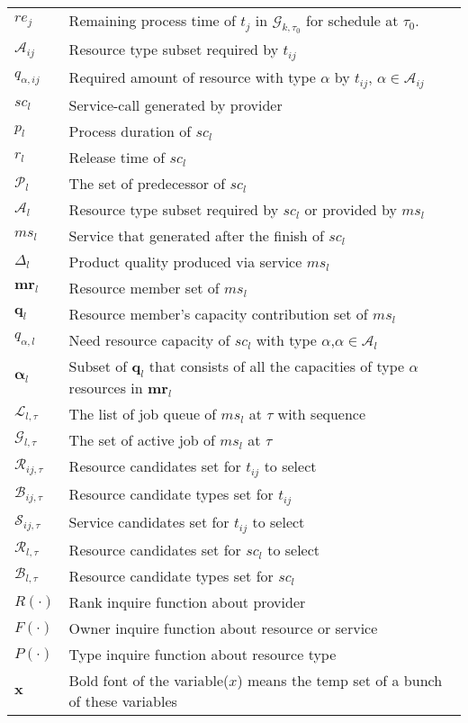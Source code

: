 \begin{table}[htbp]
\begin{tabularx}{\textwidth}{|lX|}
    $re_j$ & Remaining process time of $t_j$ in $\mathcal{G}_{k,\tau_0}$ for schedule at $\tau_0$. \\
    $\mathcal{A}_{ij}$ & Resource type subset required by $t_{ij}$\\ %
    $q_{\alpha,ij}$ & Required amount of resource with type $\alpha$ by $t_{ij}$, $\alpha\in\mathcal{A}_{ij}$\\
    $sc_l$ & Service-call generated by provider\\
    $p_l$ & Process duration of $sc_l$\\
    $r_l$ & Release time of $sc_l$\\
    $\mathcal{P}_{l}$ & The set of predecessor of $sc_{l}$\\
    $\mathcal{A}_l$ & Resource type subset required by $sc_l$ or provided by $ms_l$ \\ %
    $ms_l$ & Service that generated after the finish of $sc_l$\\
    $\Delta_l$ & Product quality produced via service $ms_l$\\
    $\bm{mr}_l$ & Resource member set of $ms_l$\\
    $\bm{q}_l$ & Resource member's capacity contribution set of $ms_l$\\
    $q_{\alpha,l}$ & Need resource capacity of $sc_l$ with type $\alpha$,$\alpha\in\mathcal{A}_{l}$\\
    $\bm{\alpha}_l$ & Subset of $\bm{q}_l$ that consists of all the capacities of type $\alpha$ resources in $\bm{mr}_l$\\
    $\mathcal{L}_{l,\tau}$ & The list of job queue of $ms_l$ at $\tau$ with sequence\\
    $\mathcal{G}_{l,\tau}$ & The set of active job of $ms_l$ at $\tau$ \\
    $\mathcal{R}_{ij,\tau}$ & Resource candidates set for $t_{ij}$ to select\\
    $\mathcal{B}_{ij,\tau}$ & Resource candidate types set for $t_{ij}$\\
    $\mathcal{S}_{ij,\tau}$ & Service candidates set for $t_{ij}$ to select\\
    $\mathcal{R}_{l,\tau}$ & Resource candidates set for $sc_l$ to select\\
    $\mathcal{B}_{l,\tau}$ & Resource candidate types set for $sc_l$\\
    $R(\cdot)$ & Rank inquire function about provider\\
    $F(\cdot)$ & Owner inquire function about resource or service\\
    $P(\cdot)$ & Type inquire function about resource type\\
    $\bm{x}$ & Bold font of the variable($x$) means the temp set of a bunch of these variables\\
    \hline
\end{tabularx}
\end{table}
